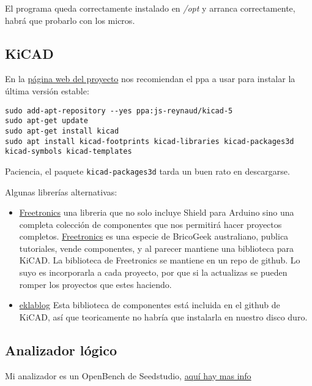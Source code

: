 \documentclass[
  12pt,
  spanish,
]{article}
\providecommand{\tightlist}{%
  \setlength{\itemsep}{0pt}\setlength{\parskip}{0pt}}
\begin{document}
El programa queda correctamente instalado en \emph{/opt} y arranca
correctamente, habrá que probarlo con los micros.

\hypertarget{kicad}{%
\subsection{KiCAD}\label{kicad}}

En la \href{http://kicad-pcb.org/download/linux-mint/}{página web del
proyecto} nos recomiendan el ppa a usar para instalar la última versión
estable:

\begin{verbatim}
sudo add-apt-repository --yes ppa:js-reynaud/kicad-5
sudo apt-get update
sudo apt-get install kicad
sudo apt install kicad-footprints kicad-libraries kicad-packages3d kicad-symbols kicad-templates
\end{verbatim}

Paciencia, el paquete \texttt{kicad-packages3d} tarda un buen rato en
descargarse.

Algunas librerías alternativas:

\begin{itemize}
\tightlist
\item
  \href{https://github.com/freetronics/freetronics_kicad_library}{Freetronics}
  una libreria que no solo incluye Shield para Arduino sino una completa
  colección de componentes que nos permitirá hacer proyectos completos.
  \href{http://www.freetronics.com}{Freetronics} es una especie de
  BricoGeek australiano, publica tutoriales, vende componentes, y al
  parecer mantiene una biblioteca para KiCAD. La biblioteca de
  Freetronics se mantiene en un repo de github. Lo suyo es incorporarla
  a cada proyecto, por que si la actualizas se pueden romper los
  proyectos que estes haciendo.
\item
  \href{http://meta-blog.eklablog.com/kicad-librairie-arduino-pretty-p930786}{eklablog}
  Esta biblioteca de componentes está incluida en el github de KiCAD,
  así que teoricamente no habría que instalarla en nuestro disco duro.
\end{itemize}

\hypertarget{analizador-luxf3gico}{%
\subsection{Analizador lógico}\label{analizador-luxf3gico}}

Mi analizador es un OpenBench de Seedstudio,
\href{http://dangerousprototypes.com/docs/Open_Bench_Logic_Sniffer}{aquí
hay mas info}
\end{document}
